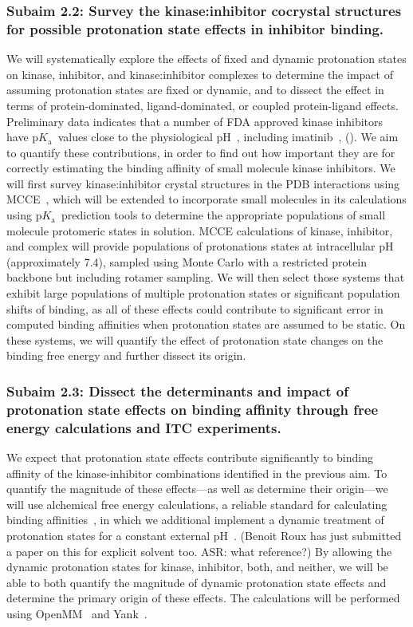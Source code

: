 \documentclass[10pt,final]{article}
\newcommand{\pKa}{p$K_\mathrm{a}$\ }
\newcommand{\pH}{p$\mathrm{H}$\ }
\begin{document}
\subsubsection*{Subaim 2.2: Survey the kinase:inhibitor cocrystal structures for possible protonation state effects in inhibitor binding.}
We will systematically explore the effects of fixed and dynamic protonation states on kinase, inhibitor, and kinase:inhibitor complexes to determine the impact of assuming protonation states are fixed or dynamic, and to dissect the effect in terms of protein-dominated, ligand-dominated, or coupled protein-ligand effects.
%
Preliminary data indicates that a number of FDA approved kinase inhibitors have \pKa values close to the physiological \pH{}, including imatinib~\autocite{Szakacs2005a}, ().
%
We aim to quantify these contributions, in order to find out how important they are for correctly estimating the binding affinity of small molecule kinase inhibitors.
%
We will first survey kinase:inhibitor crystal structures in the PDB interactions using MCCE~\autocite{Song2009a}, which will be extended to incorporate small molecules in its calculations using \pKa prediction tools to determine the appropriate populations of small molecule protomeric states in solution.
%
MCCE calculations of kinase, inhibitor, and complex will provide populations of protonations states at intracellular pH (approximately 7.4), sampled using Monte Carlo with a restricted protein backbone but including rotamer sampling.
%
We will then select those systems that exhibit large populations of multiple protonation states or significant population shifts of binding, as all of these effects could contribute to significant error in computed binding affinities when protonation states are assumed to be static.
%
On these systems, we will quantify the effect of protonation state changes on the binding free energy and further dissect its origin.

\subsubsection*{Subaim 2.3: Dissect the determinants and impact of protonation state effects on binding affinity through free energy calculations and ITC experiments.}
We expect that protonation state effects contribute significantly to binding affinity of the kinase-inhibitor combinations identified in the previous aim.
%
To quantify the magnitude of these effects---as well as determine their origin---we will use alchemical free energy calculations, a reliable standard for calculating binding affinities~\autocite{Fujitani2005a,Deng2006a,Wang2015a}, in which we additional implement a dynamic treatment of protonation states for a constant external pH~\autocite{Mongan2004a,Stern2007a,Nilmeier2011a}.
%
{\color{purple}(Benoit Roux has just submitted a paper on this for explicit solvent too. ASR: what reference?)}
%
By allowing the dynamic protonation states for kinase, inhibitor, both, and neither, we will be able to both quantify the magnitude of dynamic protonation state effects and determine the primary origin of these effects.
%
The calculations will be performed using OpenMM~\autocite{Eastman2013a} and Yank~\autocite{Chodera2015a}.
\end{document}
